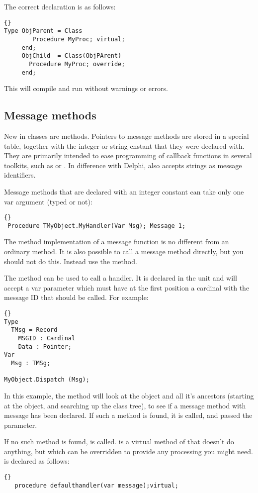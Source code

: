 \documentclass{report}
\begin{document}
The correct declaration is as follows:
\begin{lstlisting}{}
Type ObjParent = Class
        Procedure MyProc; virtual;
     end;
     ObjChild  = Class(ObjPArent)
       Procedure MyProc; override;
     end;
\end{lstlisting}{}
This will compile and run without warnings or errors.

\subsection{Message methods}
New in classes are  methods. Pointers to message methods are 
stored in a special table, together with the integer or string cnstant that
they were declared with. They are primarily intended to ease programming of
callback functions in several  toolkits, such as  or
. In difference with Delphi, \fpc also accepts strings as message
identifiers.

Message methods that are declared with an integer constant can take only one
var argument (typed or not):
\begin{lstlisting}{}
 Procedure TMyObject.MyHandler(Var Msg); Message 1;
\end{lstlisting}{}
The method implementation of a message function is no different from an
ordinary method. It is also possible to call a message method directly,
but you should not do this. Instead use the  method.

The  method can be used to call a 
handler. It is declared in the  unit and will accept a var 
parameter  which must have at the first position a cardinal with the
message ID that should be called. For example:
\begin{lstlisting}{}
Type 
  TMsg = Record
    MSGID : Cardinal
    Data : Pointer;
Var
  Msg : TMSg;

MyObject.Dispatch (Msg);
\end{lstlisting}{}
In this example, the  method will look at the object and all 
it's ancestors (starting at the object, and searching up the class tree), 
to see if a message method with message  has been
declared. If such a method is found, it is called, and passed the 
 parameter.

If no such method is found,  is called.
 is a virtual method of  that doesn't do 
anything, but which can be overridden to provide any processing you might
need.  is declared as follows:
\begin{lstlisting}{}
   procedure defaulthandler(var message);virtual;
\end{lstlisting}{}
\end{document}
